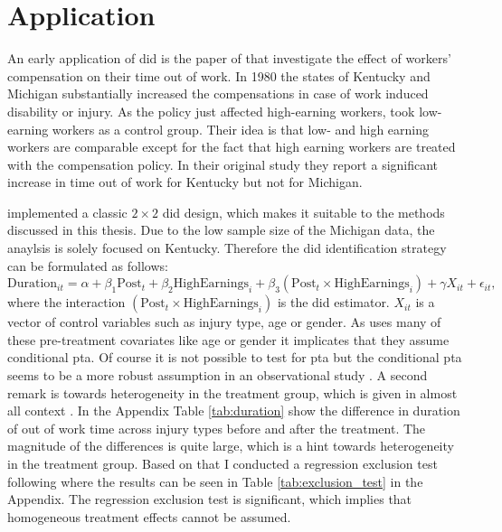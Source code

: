 \section{Application}

An early application of \ac{did} is the paper of \citet{meyer1990workers} that investigate the effect of workers' compensation on their time out of work.
In 1980 the states of Kentucky and Michigan substantially increased the compensations in case of work induced disability or injury.
As the policy just affected high-earning workers, \citet{meyer1990workers} took low-earning workers as a control group.
Their idea is that low- and high earning workers are comparable except for the fact that high earning workers are treated with the compensation policy.
In their original study they report a significant increase in time out of work for Kentucky but not for Michigan.

\citet{meyer1990workers} implemented a classic $2 \times 2$ \ac{did} design, which makes it suitable to the methods discussed in this thesis.
Due to the low sample size of the Michigan data, the anaylsis is solely focused on Kentucky.
Therefore the \ac{did} identification strategy can be formulated as follows:
\begin{equation}
\text{Duration}_{it} = \alpha + \beta_1 \text{Post}_t + \beta_2 \text{HighEarnings}_i + \beta_3 (\text{Post}_t \times \text{HighEarnings}_i) + \gamma X_{it} + \epsilon_{it},
\label{eq:duration}
\end{equation}
where the interaction $(\text{Post}_t \times \text{HighEarnings}_i)$ is the \ac{did} estimator.
$X_{it}$ is a vector of control variables such as injury type, age or gender.
As \citet{meyer1990workers} uses many of these pre-treatment covariates like age or gender it implicates that they assume conditional \ac{pta}.
Of course it is not possible to test for \ac{pta} but the conditional \ac{pta} seems to be a more robust assumption in an observational study \citep{santannaDoublyRobustDifferenceindifferences2020}.
A second remark is towards heterogeneity in the treatment group, which is given in almost all context \citep{DeepLearningIndividual2021}.
In the Appendix Table \ref{tab:duration} show the difference in duration of out of work time across injury types before and after the treatment.
The magnitude of the differences is quite large, which is a hint towards heterogeneity in the treatment group.
Based on that I conducted a regression exclusion test following \citet{hansen2022econometrics} where the results can be seen in Table \ref{tab:exclusion_test} in the Appendix.
The regression exclusion test is significant, which implies that homogeneous treatment effects cannot be assumed.

